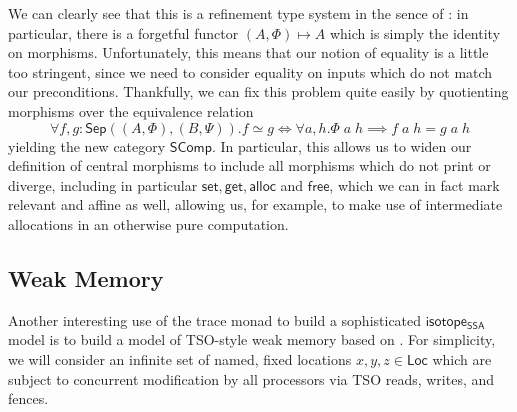 \documentclass[acmsmall,screen,review]{acmart}
\newcommand{\ms}[1]{\ensuremath{\mathsf{#1}}}
\newcommand{\isotopessa}{\ms{isotope_{SSA}}}
\begin{document}
We can clearly see that this is a refinement type system in the sence of
\cite{mellies-ftrs}: in particular, there is a forgetful functor \((A, \Phi)
\mapsto A\) which is simply the identity on morphisms. Unfortunately, this means
that our notion of equality is a little too stringent, since we need to consider
equality on inputs which do not match our preconditions. Thankfully, we can fix
this problem quite easily by quotienting morphisms over the equivalence relation
\begin{equation}
  \forall f, g: \ms{Sep}((A, \Phi), (B, \Psi)).
  f \simeq g \iff \forall a, h. \Phi\;a\;h \implies f\;a\;h = g\;a\;h
\end{equation}
yielding the new category \(\ms{SComp}\). In particular, this allows us to widen
our definition of central morphisms to include all morphisms which do not print
or diverge, including in particular \(\ms{set}, \ms{get}, \ms{alloc}\) and
\(\ms{free}\), which we can in fact mark relevant and affine as well, allowing
us, for example, to make use of intermediate allocations in an otherwise pure
computation.

\subsection{Weak Memory}

Another interesting use of the trace monad to build a sophisticated \isotopessa model is to build a model of TSO-style weak memory based on \citet{sparky}. For simplicity, we will consider an infinite set of named, fixed locations \(x, y, z \in \ms{Loc}\) which are subject to concurrent modification by all processors via TSO reads, writes, and fences.
\end{document}
